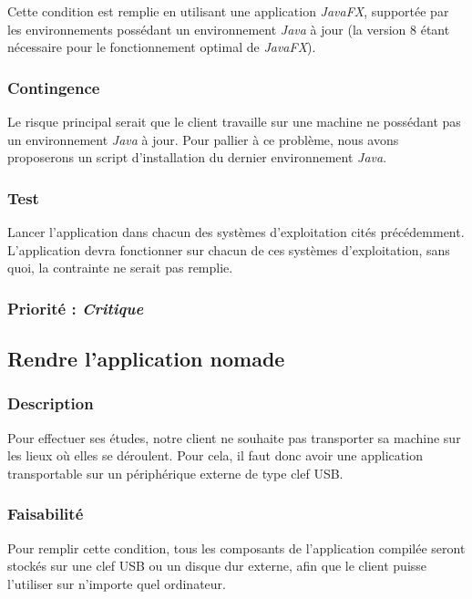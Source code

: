 Cette condition est remplie en utilisant une application \textit{JavaFX}, supportée par les environnements possédant un environnement \textit{Java} à jour (la version 8 étant nécessaire pour le fonctionnement optimal de \textit{JavaFX}).

\subsubsection{Contingence}

Le risque principal serait que le client travaille sur une machine ne possédant pas un environnement \textit{Java} à jour. Pour pallier à ce problème, nous avons proposerons un script d'installation du dernier environnement \textit{Java}.

\subsubsection{Test}

Lancer l'application dans chacun des systèmes d’exploitation cités précédemment. L'application devra fonctionner sur chacun de ces systèmes d'exploitation, sans quoi, la contrainte ne serait pas remplie.

\subsubsection{Priorité : \textit{Critique}}

\subsection{Rendre l'application nomade}\label{nomadite}

\subsubsection{Description}

Pour effectuer ses études, notre client ne souhaite pas transporter sa machine sur les lieux où elles se déroulent. Pour cela, il faut donc avoir une application transportable sur un périphérique externe de type clef USB.

\subsubsection{Faisabilité}

Pour remplir cette condition, tous les composants de l’application compilée seront stockés sur une clef USB ou un disque dur externe, afin que le client puisse l'utiliser sur n’importe quel ordinateur.

